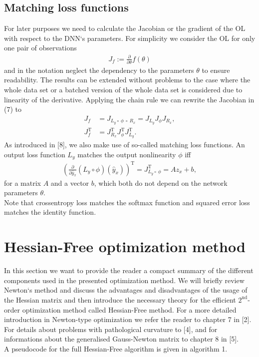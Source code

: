 \documentclass[conference]{IEEEtran}
\begin{document}
\subsection{Matching loss functions}
\noindent
For later purposes we need to calculate the Jacobian or the gradient of the OL with respect to the DNN`s parameters. For simplicity we consider the OL for only one pair of observations
\begin{align}
J_{f} := \frac{\partial}{\partial\theta}f(\theta)
\end{align}
and in the notation neglect the dependency to the parameters $\theta$ to ensure readability.
The results can be extended without problems to the case where the whole data set or a batched version of the whole data set is considered due to linearity of the derivative.
Applying the chain rule we can rewrite the Jacobian in (7) to
\begin{align}
J_{f} &= J_{L_{y}\circ \:\phi \:\circ\:R_{x}} = J_{L_{y}} J_{\phi} J_{R_{x}},\\
J_{f}^{\mathrm{T}} &= J_{R_{x}}^{\mathrm{T}}  J_{\phi}^{\mathrm{T}}  J_{L_{y}}^{\mathrm{T}}.
\end{align}
As introduced in [8], we also make use of so-called matching loss functions. An output loss function $L_{y}$ matches the output nonlinearity $\phi$ iff
\begin{align}
\left(\frac{\partial}{\partial\hat{y}_{x}}\left(L_{y}\circ \phi\right)(\hat{y}_{x})\right)^{\mathrm{T}}= J_{L_{y}\circ \:\phi}^{\mathrm{T}} = A z_{x} + b,
\end{align}
for a matrix $A$ and a vector $b$, which both do not depend on the network parameters $\theta$.\\
Note that crossentropy loss matches the softmax function and squared error loss matches the identity function.


\section{Hessian-Free optimization method}
\noindent
In this section we want to provide the reader a compact summary of the different components used in the presented optimization method. We will briefly review Newton`s method and discuss the advantages and disadvantages of the usage of the Hessian matrix and then introduce the necessary theory for the efficient $2^{\text{nd}}$-order optimization method called Hessian-Free method. For a more detailed introduction in Newton-type optimization we refer the reader to chapter 7 in [2]. For details about problems with pathological curvature to [4], and for informations about the generalised Gauss-Newton matrix to chapter 8 in [5].\\
A pseudocode for the full Hessian-Free algorithm is given in algorithm 1.
\end{document}

